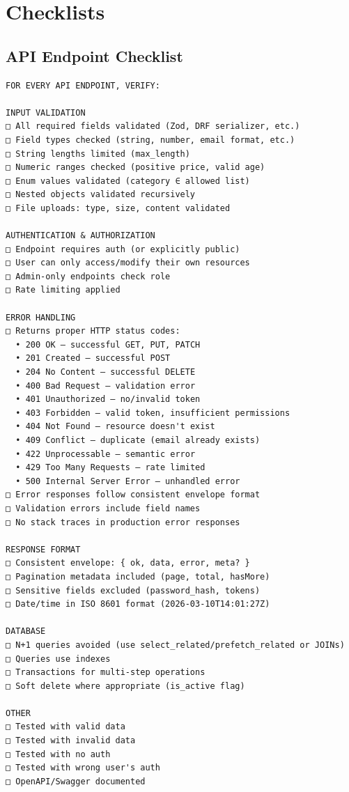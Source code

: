 \documentclass[10pt, a4paper]{article}
\begin{document}
\bigskip


\section{Checklists}


\subsection{API Endpoint Checklist}


\begin{lstlisting}
FOR EVERY API ENDPOINT, VERIFY:

INPUT VALIDATION
□ All required fields validated (Zod, DRF serializer, etc.)
□ Field types checked (string, number, email format, etc.)
□ String lengths limited (max_length)
□ Numeric ranges checked (positive price, valid age)
□ Enum values validated (category ∈ allowed list)
□ Nested objects validated recursively
□ File uploads: type, size, content validated

AUTHENTICATION & AUTHORIZATION
□ Endpoint requires auth (or explicitly public)
□ User can only access/modify their own resources
□ Admin-only endpoints check role
□ Rate limiting applied

ERROR HANDLING
□ Returns proper HTTP status codes:
  • 200 OK — successful GET, PUT, PATCH
  • 201 Created — successful POST
  • 204 No Content — successful DELETE
  • 400 Bad Request — validation error
  • 401 Unauthorized — no/invalid token
  • 403 Forbidden — valid token, insufficient permissions
  • 404 Not Found — resource doesn't exist
  • 409 Conflict — duplicate (email already exists)
  • 422 Unprocessable — semantic error
  • 429 Too Many Requests — rate limited
  • 500 Internal Server Error — unhandled error
□ Error responses follow consistent envelope format
□ Validation errors include field names
□ No stack traces in production error responses

RESPONSE FORMAT
□ Consistent envelope: { ok, data, error, meta? }
□ Pagination metadata included (page, total, hasMore)
□ Sensitive fields excluded (password_hash, tokens)
□ Date/time in ISO 8601 format (2026-03-10T14:01:27Z)

DATABASE
□ N+1 queries avoided (use select_related/prefetch_related or JOINs)
□ Queries use indexes
□ Transactions for multi-step operations
□ Soft delete where appropriate (is_active flag)

OTHER
□ Tested with valid data
□ Tested with invalid data
□ Tested with no auth
□ Tested with wrong user's auth
□ OpenAPI/Swagger documented
\end{lstlisting}
\end{document}
